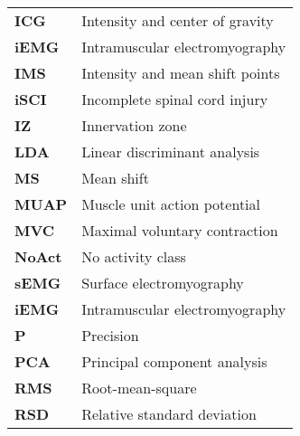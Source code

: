 \begin{acronyms}
\begin{table}[!h]
\begin{tabular}{ll}
\textbf{ICG}                 & Intensity and center of gravity                                                                                 \\
\textbf{iEMG}             & Intramuscular electromyography                                                                    \\
\textbf{IMS}                 & Intensity and mean shift points                                                                                 \\
\textbf{iSCI}             & Incomplete spinal cord injury                                                                    \\
\textbf{IZ}             & Innervation zone                                                                                 \\
\textbf{LDA}             & Linear discriminant analysis                                                                    \\
\textbf{MS}             & Mean shift                                                                  \\
\textbf{MUAP}             & Muscle unit action potential                                                                  \\
\textbf{MVC}             & Maximal voluntary contraction                                                                  \\
\textbf{NoAct}             & No activity class                                                                  \\
\textbf{sEMG}             & Surface electromyography                                                                        \\
\textbf{iEMG}             & Intramuscular electromyography                                                                    \\
\textbf{P}                 & Precision                                                                                  \\
\textbf{PCA}                 & Principal component analysis                                                                                  \\
\textbf{RMS}             & Root-mean-square                                                                    \\
\textbf{RSD}             & Relative standard deviation                                                                  \\

\end{tabular}
\end{table}
\end{acronyms}

